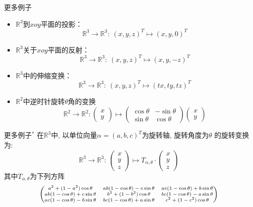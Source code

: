 
\begin{frame}

\begin{block}{更多例子}
\begin{itemize}
\item<1-> $\mathbb{R}^3$到$xoy$平面的投影：
$$\mathbb{R}^3 \to \mathbb{R}^3: \ (x,y,z)^T \mapsto (x,y,0)^T$$
\item<2-> $\mathbb{R}^3$关于$xoy$平面的反射：
$$\mathbb{R}^3 \to \mathbb{R}^3: \ (x,y,z)^T \mapsto (x,y,-z)^T$$
\item<3-> $\mathbb{R}^3$中的伸缩变换：
$$\mathbb{R}^3 \to \mathbb{R}^3: \ (x,y,z)^T \mapsto (tx,ty,tz)^T$$
\item<4-> $\mathbb{R}^2$中逆时针旋转$\theta$角的变换
\[
\mathbb{R}^2 \to \mathbb{R}^2: \begin{pmatrix} x \\ y \end{pmatrix} \mapsto \begin{pmatrix} \cos\theta & -\sin\theta \\ \sin\theta & \cos\theta \end{pmatrix} \begin{pmatrix} x \\ y \end{pmatrix}
\]
\end{itemize}
\end{block}

\end{frame}


\begin{frame}

\begin{block}{更多例子$^*$}
在$\mathbb{R}^3$中, 以单位向量$\alpha = (a,b,c)^T$为旋转轴, 旋转角度为$\theta$ 的旋转变换为:
\[
\mathbb{R}^3 \to \mathbb{R}^3: \ \begin{pmatrix} x \\ y \\ z \end{pmatrix} \mapsto T_{\alpha, \theta} \cdot \begin{pmatrix} x \\ y \\ z \end{pmatrix}
\]
其中$T_{\alpha, \theta}$为下列方阵
\begin{displaymath}
\scriptsize
\begin{pmatrix} a^2+(1-a^2)\cos\theta & ab(1-\cos\theta)-c\sin\theta & ac(1-\cos\theta)+b\sin\theta\\
ab(1-\cos\theta)+c\sin\theta & b^2+(1-b^2)\cos\theta & bc(1-\cos\theta)-a\sin\theta  \\
ac(1-\cos\theta)-b\sin\theta& bc(1-\cos\theta)+a\sin\theta & c^2+(1-c^2)\cos\theta\end{pmatrix}\end{displaymath}
\end{block}

\end{frame}

